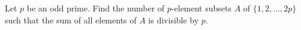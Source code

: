 Let $p$ be an odd prime. Find the number of $p$-element subsets $A$ of $\{1, 2, \ldots, 2p\}$ such that the sum of all elements of $A$ is divisible by $p$.

